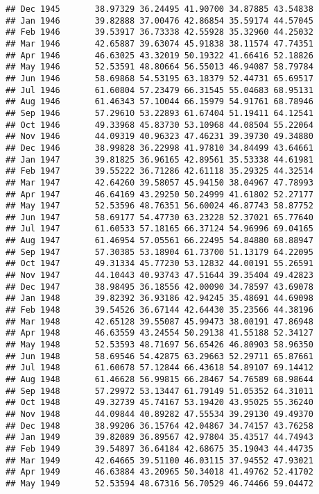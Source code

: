 \documentclass[
]{article}
\begin{document}
\begin{verbatim}
## Dec 1945       38.97329 36.24495 41.90700 34.87885 43.54838
## Jan 1946       39.82888 37.00476 42.86854 35.59174 44.57045
## Feb 1946       39.53917 36.73338 42.55928 35.32960 44.25032
## Mar 1946       42.65887 39.63074 45.91838 38.11574 47.74351
## Apr 1946       46.63025 43.32019 50.19322 41.66416 52.18826
## May 1946       52.53591 48.80664 56.55013 46.94087 58.79784
## Jun 1946       58.69868 54.53195 63.18379 52.44731 65.69517
## Jul 1946       61.60804 57.23479 66.31545 55.04683 68.95131
## Aug 1946       61.46343 57.10044 66.15979 54.91761 68.78946
## Sep 1946       57.29610 53.22893 61.67404 51.19411 64.12541
## Oct 1946       49.33968 45.83730 53.10968 44.08504 55.22064
## Nov 1946       44.09319 40.96323 47.46231 39.39730 49.34880
## Dec 1946       38.99828 36.22998 41.97810 34.84499 43.64661
## Jan 1947       39.81825 36.96165 42.89561 35.53338 44.61981
## Feb 1947       39.55222 36.71286 42.61118 35.29325 44.32514
## Mar 1947       42.64260 39.58057 45.94150 38.04967 47.78993
## Apr 1947       46.64169 43.29250 50.24999 41.61802 52.27177
## May 1947       52.53596 48.76351 56.60024 46.87743 58.87752
## Jun 1947       58.69177 54.47730 63.23228 52.37021 65.77640
## Jul 1947       61.60533 57.18165 66.37124 54.96996 69.04165
## Aug 1947       61.46954 57.05561 66.22495 54.84880 68.88947
## Sep 1947       57.30385 53.18904 61.73700 51.13179 64.22095
## Oct 1947       49.31334 45.77230 53.12832 44.00191 55.26591
## Nov 1947       44.10443 40.93743 47.51644 39.35404 49.42823
## Dec 1947       38.98495 36.18556 42.00090 34.78597 43.69078
## Jan 1948       39.82392 36.93186 42.94245 35.48691 44.69098
## Feb 1948       39.54526 36.67144 42.64430 35.23566 44.38196
## Mar 1948       42.65128 39.55087 45.99473 38.00191 47.86948
## Apr 1948       46.63559 43.24554 50.29138 41.55188 52.34127
## May 1948       52.53593 48.71697 56.65426 46.80903 58.96350
## Jun 1948       58.69546 54.42875 63.29663 52.29711 65.87661
## Jul 1948       61.60678 57.12844 66.43618 54.89107 69.14412
## Aug 1948       61.46628 56.99815 66.28467 54.76589 68.98644
## Sep 1948       57.29972 53.13447 61.79149 51.05352 64.31011
## Oct 1948       49.32739 45.74167 53.19420 43.95025 55.36240
## Nov 1948       44.09844 40.89282 47.55534 39.29130 49.49370
## Dec 1948       38.99206 36.15764 42.04867 34.74157 43.76258
## Jan 1949       39.82089 36.89567 42.97804 35.43517 44.74943
## Feb 1949       39.54897 36.64184 42.68675 35.19043 44.44735
## Mar 1949       42.64665 39.51100 46.03115 37.94552 47.93021
## Apr 1949       46.63884 43.20965 50.34018 41.49762 52.41702
## May 1949       52.53594 48.67316 56.70529 46.74466 59.04472

\end{verbatim}
\end{document}

